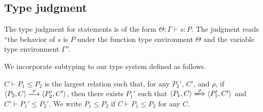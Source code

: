 \subsection{Type judgment}

The type judgment for statements is of the form \(\Theta; \Gamma \vdash
s : P \).  The judgment reads ``the behavior of $s$ is $P$ under the
function type environment $\Theta$ and the variable type environment
$\Gamma$''.

We incorporate subtyping to our type system defined as follows.
\begin{myDef}[Subtyping]
\label{df:subtype} \(C \vdash P_1 \le P_2\) is the largest relation such
that, for any \(P_2'\), $C'$, and \(\rho\), if \( \langle P_2, C \rangle
\xlongrightarrow{\rho} \langle P_2', C' \rangle \), then there exists
\(P_1'\) such that \( \langle P_1, C \rangle \xLongrightarrow{\rho}
\langle P_1', C' \rangle \) and \(C' \vdash P_1' \le P_2'\).  We write
\(P_1 \le P_2\) if \(C \vdash P_1 \le P_2\) for any \(C\).
\end{myDef}

